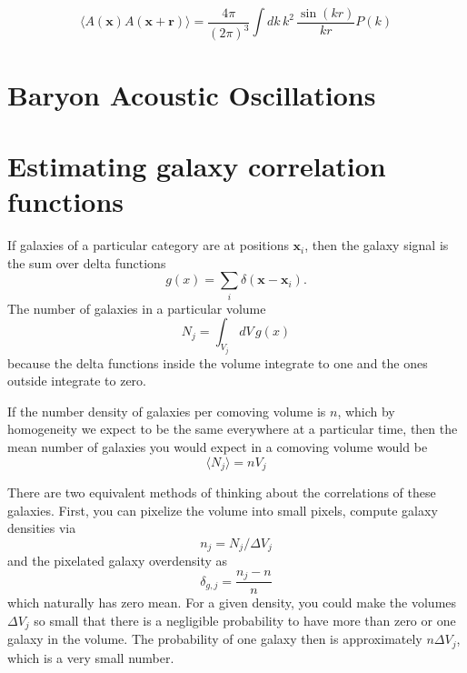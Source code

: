\begin{equation}
 \langle  A(\mathbf{x})A(\mathbf{x+r}) \rangle = \frac{4\pi}{(2\pi)^3} \int dk\, k^2\, \frac{\sin(kr)}{kr} P(k)
\end{equation}




\section{Baryon Acoustic Oscillations}



\section{Estimating galaxy correlation functions}


If galaxies of a particular category are at positions $\mathbf{x}_i$, then the galaxy signal is the sum over delta functions
\begin{equation}
  g(x) = \sum_i   \delta(\mathbf{x} - \mathbf{x}_i).
\end{equation}
The number of galaxies in a particular volume 
\begin{equation}
  N_j = \int_{V_j}  dV \, g(x)
\end{equation}
because the delta functions inside the volume integrate to one and the ones outside integrate to zero.

If the number density of galaxies per comoving volume is $n$, which by homogeneity we expect to be the same everywhere at a particular time, then the mean number of galaxies you would expect in a comoving volume would be
\begin{equation}
  \langle N_j \rangle  = n V_j
\end{equation}

There are two equivalent methods of thinking about the correlations of these galaxies.  First, you can pixelize the volume into small pixels, compute galaxy densities via
\begin{equation}
 n_j = N_j / \Delta V_j
\end{equation}
and the pixelated galaxy overdensity as
\begin{equation}
  \delta_{g,j} = \frac{n_j - n}{n}
\end{equation}
which naturally has zero mean.
For a given density, you could make the volumes $\Delta V_j$ so small that there is a negligible probability to have more than zero or one galaxy in the volume.  The probability of one galaxy then is approximately $n \Delta V_j$, which is a very small number.


